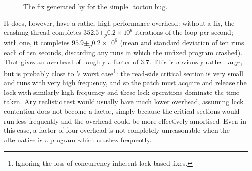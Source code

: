 \begin{figure}
  \centerline{
    {\hfill}
  {\hfill}
  \hfill
  }
  \caption{The fix generated by {\implementation} for the simple\_toctou bug.}
  \label{fig:eval:simple_toctou:fix}
\end{figure}

It does, however, have a rather high performance overhead: without a
fix, the crashing thread completes $352.5 \pm_p 0.2 {\times} 10^6$
iterations of the loop per second; with one, it completes $95.9 \pm_p
0.2 {\times} 10^6$ (mean and standard deviation of ten runs each of
ten seconds, discarding any runs in which the unfixed program
crashed).  That gives an overhead of roughly a factor of 3.7.  This is
obviously rather large, but is probably close to {\technique}'s worst
case\footnote{Ignoring the loss of concurrency inherent lock-based
  fixes.}: the read-side critical section is very small and runs with
very high frequency, and so the patch must acquire and release the
lock with similarly high frequency and these lock operations dominate
the time taken.  Any realistic test would usually have much lower
overhead, assuming lock contention does not become a factor, simply
because the critical sections would run less frequently and the
overhead could be more effectively amortised.  Even in this case, a
factor of four overhead is not completely unreasonable when the
alternative is a program which crashes frequently.

